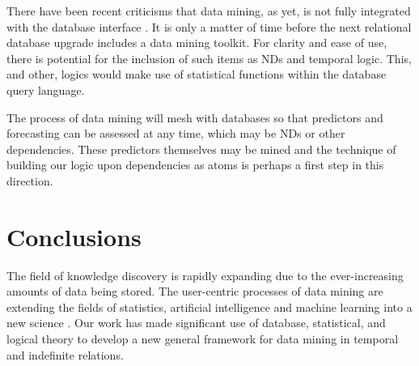\medskip

There have been recent criticisms that data mining, as yet, is not
fully integrated with the database interface \cite{man97,joh97,cha98}. It is
only a matter of time before the next relational database upgrade
includes a data mining toolkit. For clarity and ease of use, there is
potential for the inclusion of such items as NDs and temporal logic. This,
and other, logics would make use of statistical functions within the 
database query language.  

\medskip
The process of data mining will mesh with databases so that predictors
and forecasting can be assessed at any time, which may be NDs or other
dependencies. These predictors themselves may be mined and
the technique of building our logic
upon dependencies as atoms is perhaps a first step in this direction. 

\section{Conclusions}

The field of knowledge discovery is rapidly expanding due to the
ever-increasing amounts of data being stored. The user-centric
processes of data mining are extending the fields of statistics,
artificial intelligence and machine learning into a new science
\cite{fu96}. Our work has made significant use of database,
statistical, and logical theory to develop a new general framework for
data mining in temporal and indefinite relations.




